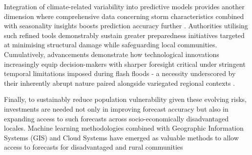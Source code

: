 Integration of climate-related variability into predictive models provides another dimension where comprehensive data concerning storm characteristics combined with seasonality insights boosts prediction accuracy further \citep{Kuksina2020}. Authorities utilising such refined tools demonstrably sustain greater preparedness initiatives targeted at minimising structural damage while safeguarding local communities.
Cumulatively, advancements demonstrate how technological innovations increasingly equip decision-makers with sharper foresight critical under stringent temporal limitations imposed during flash floods - a necessity underscored by their inherently abrupt nature paired alongside variegated regional contexts \citep{Maqtan2022a}\citep{Laudan2020}.

Finally, to sustainably reduce population vulnerability given these evolving risks, investments are needed not only in improving forecast accuracy but also in expanding access to such forecasts across socio-economically disadvantaged locales. Machine learning methodologies combined with Geographic Information Systems (GIS) and Cloud Systems have emerged as valuable methods to allow access to forecasts for disadvantaged and rural communities